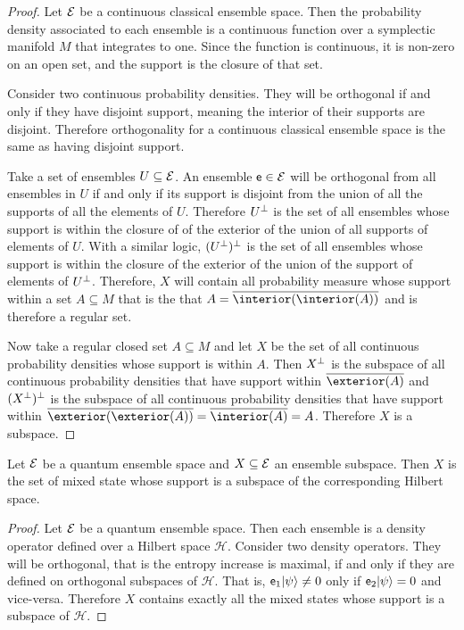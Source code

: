 \begin{proof}
	Let $\mathcal{E}$ be a continuous classical ensemble space. Then the probability density associated to each ensemble is a continuous function over a symplectic manifold $M$ that integrates to one. Since the function is continuous, it is non-zero on an open set, and the support is the closure of that set.
	
	Consider two continuous probability densities. They will be orthogonal if and only if they have disjoint support, meaning the interior of their supports are disjoint. Therefore orthogonality for a continuous classical ensemble space is the same as having disjoint support.
	
	Take a set of ensembles $U \subseteq \mathcal{E}$. An ensemble $\mathsf{e} \in \mathcal{E}$ will be orthogonal from all ensembles in $U$ if and only if its support is disjoint from the union of all the supports of all the elements of $U$. Therefore $U^\perp$ is the set of all ensembles whose support is within the closure of of the exterior of the union of all supports of elements of $U$. With a similar logic, $(U^\perp)^\perp$ is the set of all ensembles whose support is within the closure of the exterior of the union of the support of elements of $U^\perp$. Therefore, $X$ will contain all probability measure whose support within a set $A \subseteq M$ that is the that $A = \overline{\interior(\interior(A))}$ and is therefore a regular set.
	
	Now take a regular closed set $A \subseteq M$ and let $X$ be the set of all continuous probability densities whose support is within $A$. Then $X^\perp$ is the subspace of all continuous probability densities that have support within $\overline{\exterior(A)}$ and $(X^\perp)^\perp$ is the subspace of all continuous probability densities that have support within $\overline{\exterior(\exterior(A))} = \overline{\interior(A)} = A$. Therefore $X$ is a subspace.
\end{proof}

\begin{prop}
	Let $\mathcal{E}$ be a quantum ensemble space and $X \subseteq \mathcal{E}$ an ensemble subspace. Then $X$ is the set of mixed state whose support is a subspace of the corresponding Hilbert space.
\end{prop}

\begin{proof}
	Let $\mathcal{E}$ be a quantum ensemble space. Then each ensemble is a density operator defined over a Hilbert space $\mathcal{H}$. Consider two density operators. They will be orthogonal, that is the entropy increase is maximal, if and only if they are defined on orthogonal subspaces of $\mathcal{H}$. That is, $\mathsf{e}_1 | \psi \rangle \neq 0$ only if $\mathsf{e}_2 | \psi \rangle = 0$ and vice-versa. Therefore $X$ contains exactly all the mixed states whose support is a subspace of $\mathcal{H}$.
\end{proof}

